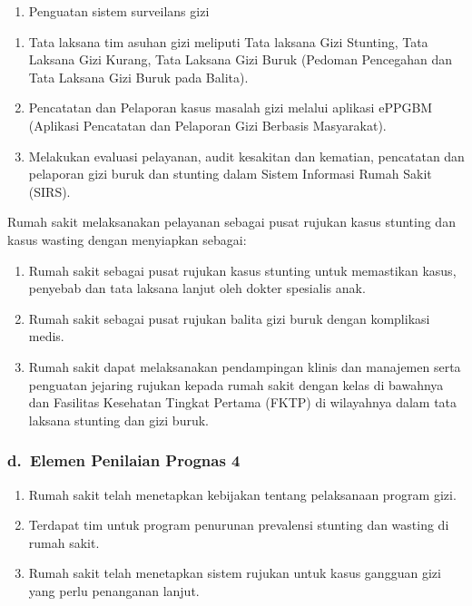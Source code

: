 \documentclass[
]{book}
\providecommand{\tightlist}{%
  \setlength{\itemsep}{0pt}\setlength{\parskip}{0pt}}
\begin{document}
\begin{enumerate}
\def\labelenumi{\arabic{enumi}.}
\setcounter{enumi}{2}
\tightlist
\item
  Penguatan sistem surveilans gizi
\end{enumerate}

\begin{enumerate}
\def\labelenumi{\alph{enumi}.}
\tightlist
\item
  Tata laksana tim asuhan gizi meliputi Tata laksana Gizi Stunting, Tata Laksana Gizi Kurang, Tata Laksana Gizi Buruk (Pedoman Pencegahan dan Tata Laksana Gizi Buruk pada Balita).
\item
  Pencatatan dan Pelaporan kasus masalah gizi melalui aplikasi ePPGBM (Aplikasi Pencatatan dan Pelaporan Gizi Berbasis Masyarakat).
\item
  Melakukan evaluasi pelayanan, audit kesakitan dan kematian, pencatatan dan pelaporan gizi buruk dan stunting dalam Sistem Informasi Rumah Sakit (SIRS).
\end{enumerate}

Rumah sakit melaksanakan pelayanan sebagai pusat rujukan kasus stunting dan kasus wasting dengan menyiapkan sebagai:

\begin{enumerate}
\def\labelenumi{\arabic{enumi}.}
\tightlist
\item
  Rumah sakit sebagai pusat rujukan kasus stunting untuk memastikan kasus, penyebab dan tata laksana lanjut oleh dokter spesialis anak.
\item
  Rumah sakit sebagai pusat rujukan balita gizi buruk dengan komplikasi medis.
\item
  Rumah sakit dapat melaksanakan pendampingan klinis dan manajemen serta penguatan jejaring rujukan kepada rumah sakit dengan kelas di bawahnya dan Fasilitas Kesehatan Tingkat Pertama (FKTP) di wilayahnya dalam tata laksana stunting dan gizi buruk.
\end{enumerate}

\hypertarget{d.-elemen-penilaian-prognas-4}{%
\subsubsection*{d.~Elemen Penilaian Prognas 4}\label{d.-elemen-penilaian-prognas-4}}

\begin{enumerate}
\def\labelenumi{\arabic{enumi}.}
\tightlist
\item
  Rumah sakit telah menetapkan kebijakan tentang pelaksanaan program gizi.
\item
  Terdapat tim untuk program penurunan prevalensi stunting dan wasting di rumah sakit.
\item
  Rumah sakit telah menetapkan sistem rujukan untuk kasus gangguan gizi yang perlu penanganan lanjut.
\end{enumerate}
\end{document}
